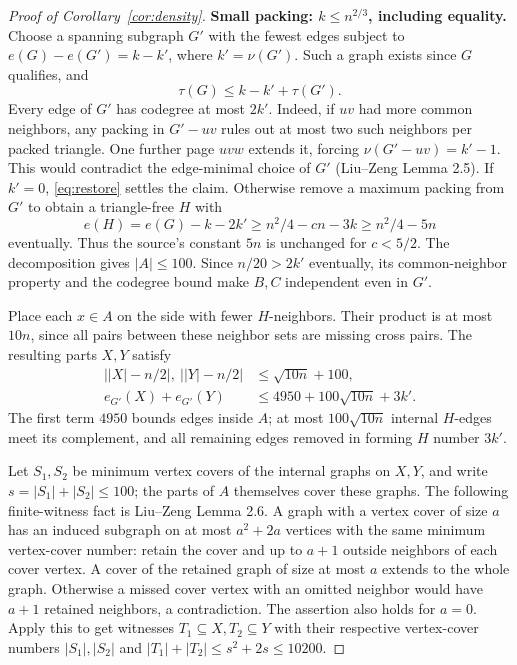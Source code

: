 \documentclass[11pt]{article}
\theoremstyle{definition}\newtheorem{definition}[theorem]{Definition}
\theoremstyle{remark}\newtheorem{remark}[theorem]{Remark}
\begin{document}
\begin{proof}[Proof of Corollary~\ref{cor:density}]
\par\medskip\noindent\textbf{Small packing: $k\le n^{2/3}$, including equality.}
Choose a spanning subgraph $G'$ with the fewest edges subject to
$e(G)-e(G')=k-k'$, where $k'=\nu(G')$. Such a graph exists since $G$
qualifies, and
\begin{equation}\label{eq:restore}
\tau(G)\le k-k'+\tau(G').
\end{equation}
Every edge of $G'$ has codegree at most $2k'$. Indeed, if $uv$ had more
common neighbors, any packing in $G'-uv$ rules out at most two such
neighbors per packed triangle. One further page $uvw$ extends it,
forcing $\nu(G'-uv)=k'-1$. This would contradict the edge-minimal
choice of $G'$ (Liu--Zeng Lemma 2.5).
If $k'=0$, \eqref{eq:restore} settles the claim. Otherwise remove a
maximum packing from $G'$ to obtain a triangle-free $H$ with
\begin{equation}\label{eq:small-deficit}
e(H)=e(G)-k-2k'\ge n^2/4-cn-3k\ge n^2/4-5n
\end{equation}
eventually. Thus the source's constant $5n$ is unchanged for $c<5/2$.
The decomposition gives $|A|\le100$. Since $n/20>2k'$ eventually,
its common-neighbor property and the codegree bound make $B,C$
independent even in $G'$.

Place each $x\in A$ on the side with fewer $H$-neighbors. Their product
is at most $10n$, since all pairs between these neighbor sets are missing
cross pairs. The resulting parts $X,Y$ satisfy
\begin{equation}\label{eq:small-partition}
\begin{aligned}
\bigl||X|-n/2\bigr|,\ \bigl||Y|-n/2\bigr|&\le\sqrt{10n}+100,\\
e_{G'}(X)+e_{G'}(Y)&\le4950+100\sqrt{10n}+3k'.
\end{aligned}
\end{equation}
The first term $4950$ bounds edges inside $A$; at most
$100\sqrt{10n}$ internal $H$-edges meet its complement, and all
remaining edges removed in forming $H$ number $3k'$.

Let $S_1,S_2$ be minimum vertex covers of the internal graphs on $X,Y$,
and write $s=|S_1|+|S_2|\le100$; the parts of $A$ themselves cover
these graphs. The following finite-witness fact is Liu--Zeng Lemma 2.6.
A graph with a vertex cover of size $a$ has an induced subgraph on at
most $a^2+2a$ vertices with the same minimum vertex-cover number:
retain the cover and up to $a+1$ outside neighbors of each cover
vertex. A cover of the retained graph of size at most $a$ extends
to the whole graph. Otherwise a missed cover vertex with an omitted
neighbor would have $a+1$ retained neighbors, a contradiction.
The assertion also holds for $a=0$.
Apply this to get witnesses $T_1\subseteq X,T_2\subseteq Y$ with their
respective vertex-cover numbers $|S_1|,|S_2|$ and
$|T_1|+|T_2|\le s^2+2s\le10200$.


\end{proof}
\end{document}
